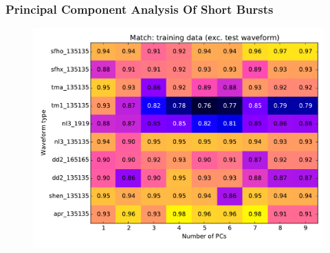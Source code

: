 \documentclass[serif,mathserif]{beamer}
\begin{document}
\begin{frame}
    \frametitle{Principal Component Analysis Of Short Bursts}

        \begin{center}
            \vspace{-0.5cm}
            \begin{figure}
                \includegraphics[width=\columnwidth]{figures/match_grid_exctestwav.pdf}
            \end{figure}
        \end{center}


\end{frame}
\end{document}
